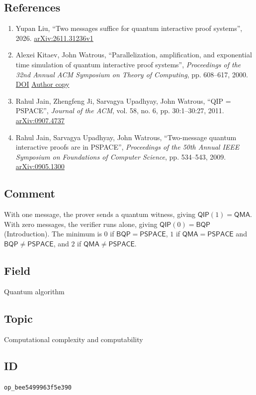 \subsection*{References}

\begin{enumerate}[label={},leftmargin=4.8em,labelsep=0.5em]
  \footnotesize
  \item[\textup{[Liu26]}]\label{ref:f5e390-liu26}
  Yupan Liu, “Two messages suffice for quantum interactive proof systems”, 2026.
\href{https://arxiv.org/abs/2611.31236v1}{arXiv:2611.31236v1}

  \item[\textup{[KW00]}]\label{ref:f5e390-kw00}
  Alexei Kitaev, John Watrous, “Parallelization, amplification, and exponential time simulation of quantum interactive proof systems”, \emph{Proceedings of the 32nd Annual ACM Symposium on Theory of Computing}, pp. 608--617, 2000.
\href{https://doi.org/10.1145/335305.335387}{DOI}
\href{https://cs.uwaterloo.ca/~watrous/Papers/QuantumInteractiveProofs.pdf#page=8}{Author copy}

  \item[\textup{[JJUW11]}]\label{ref:f5e390-jjuw11}
  Rahul Jain, Zhengfeng Ji, Sarvagya Upadhyay, John Watrous, “QIP = PSPACE”, \emph{Journal of the ACM}, vol. 58, no. 6, pp. 30:1--30:27, 2011.
\href{https://arxiv.org/abs/0907.4737}{arXiv:0907.4737}

  \item[\textup{[JUW09]}]\label{ref:f5e390-juw09}
  Rahul Jain, Sarvagya Upadhyay, John Watrous, “Two-message quantum interactive proofs are in PSPACE”, \emph{Proceedings of the 50th Annual IEEE Symposium on Foundations of Computer Science}, pp. 534--543, 2009.
\href{https://arxiv.org/abs/0905.1300}{arXiv:0905.1300}
\end{enumerate}

\subsection*{Comment}

With one message, the prover sends a quantum witness, giving $\mathsf{QIP}(1)=\mathsf{QMA}$. With zero messages, the verifier runs alone, giving $\mathsf{QIP}(0)=\mathsf{BQP}$  (Introduction).
The minimum is $0$ if $\mathsf{BQP}=\mathsf{PSPACE}$, $1$ if $\mathsf{QMA}=\mathsf{PSPACE}$ and $\mathsf{BQP}\ne\mathsf{PSPACE}$, and $2$ if $\mathsf{QMA}\ne\mathsf{PSPACE}$.

\subsection*{Field}

Quantum algorithm

\subsection*{Topic}

Computational complexity and computability

\subsection*{ID}

\texttt{op\_bee5499963f5e390}
